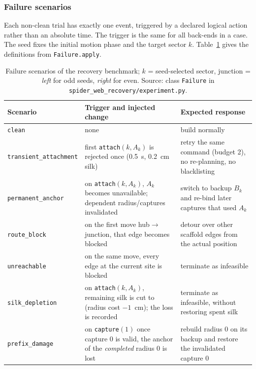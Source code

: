 \subsubsection{Failure scenarios}
Each non-clean trial has exactly one event, triggered by a declared logical action rather than an
absolute time. The trigger is the same for all back-ends in a case. The seed fixes the initial motion
phase and the target sector $k$. Table~\ref{tab:recovery-scenarios} gives the definitions from
\texttt{Failure.apply}.

\begin{table}[H]
\centering
\caption{Failure scenarios of the recovery benchmark; $k$ = seed-selected sector, junction =
\emph{left} for odd seeds, \emph{right} for even. Source: class \texttt{Failure} in
\texttt{spider\_web\_recovery/experiment.py}.}
\label{tab:recovery-scenarios}
\small
\begin{tabularx}{\linewidth}{@{}l>{\raggedright\arraybackslash}X>{\raggedright\arraybackslash}X@{}}
\toprule
Scenario & Trigger and injected change & Expected response \\
\midrule
\texttt{clean} & none & build normally \\
\texttt{transient\_attachment} & first \texttt{attach}$(k, A_k)$ is rejected once (0.5~s, 0.2~cm silk) & retry the same command (budget 2), no re-planning, no blacklisting \\
\texttt{permanent\_anchor} & on \texttt{attach}$(k, A_k)$, $A_k$ becomes unavailable; dependent radius/captures invalidated & switch to backup $B_k$ and re-bind later captures that used $A_k$ \\
\texttt{route\_block} & on the first move hub$\to$junction, that edge becomes blocked & detour over other scaffold edges from the actual position \\
\texttt{unreachable} & on the same move, every edge at the current site is blocked & terminate as infeasible \\
\texttt{silk\_depletion} & on \texttt{attach}$(k, A_k)$, remaining silk is cut to (radius cost $-1$~cm); the loss is recorded & terminate as infeasible, without restoring spent silk \\
\texttt{prefix\_damage} & on \texttt{capture}$(1)$ once capture 0 is valid, the anchor of the \emph{completed} radius 0 is lost & rebuild radius 0 on its backup and restore the invalidated capture 0 \\
\bottomrule
\end{tabularx}
\end{table}

